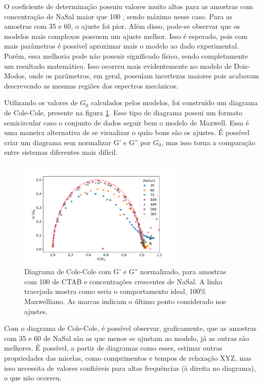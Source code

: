 	O coeficiente de determinação possuiu valores muito altos para as amostras com concentração de NaSal maior que 100 \mM, sendo máximo nesse caso. Para as amostras com 35 e 60, o ajuste foi pior. Além disso, pode-se observar que os modelos mais complexos possuem um ajuste melhor. Isso é esperado, pois com mais parâmetros é possível aproximar mais o modelo ao dado experimental. Porém, essa melhoria pode não possuir significado físico, sendo completamente um resultado matemático. Isso ocorreu mais evidentemente no modelo de Dois-Modos, onde os parâmetros, em geral, possuíam incertezas maiores pois acabavam descrevendo as mesmas regiões dos espectros mecânicos.
	
	
	Utilizando os valores de \(G_0\) calculados pelos modelos, foi construído um diagrama de Cole-Cole, presente na figura \ref{fig:colecole_agua}. Esse tipo de diagrama possui um formato semicircular caso o conjunto de dados seguir bem o modelo de Maxwell. Essa é uma maneira alternativa de se visualizar o quão bons são os ajustes. É possível criar um diagrama sem normalizar G' e G'' por \(G_0\), mas isso torna a comparação entre sistemas diferentes mais difícil.

		\begin{figure}
			\centering
			\includegraphics[width=0.7\textwidth]{imagens/reologia/colecole_agua}
			\caption{Diagrama de Cole-Cole com G' e G'' normalizado, para amostras com 100 \mM{} de CTAB e concentrações crescentes de NaSal. A linha tracejada mostra como seria o comportamento ideal, 100\% Maxwelliano. As marcas indicam o último ponto considerado nos ajustes.}
			\label{fig:colecole_agua}
		\end{figure}

	Com o diagrama de Cole-Cole, é possível observar, graficamente, que as amostras com 35 e 60 \mM{} de NaSal são as que menos se ajustam ao modelo, já as outras são melhores. É possível, a partir de diagramas como esses, estimar outras propriedades das micelas, como comprimentos e tempos de relaxação XYZ, mas isso necessita de valores confiáveis para altas frequências (à direita no diagrama), o que não ocorreu.  %
	
